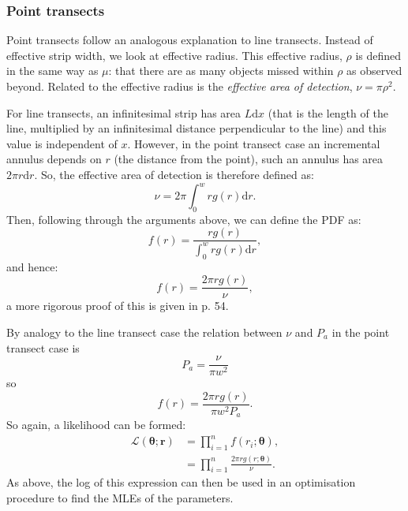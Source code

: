 \subsubsection{Point transects} 

Point transects follow an analogous explanation to line transects. Instead of effective strip width, we look at effective radius. This effective radius, $\rho$ is defined in the same way as $\mu$: that there are as many objects missed within $\rho$ as observed beyond. Related to the effective radius is the \textit{effective area of detection}, $\nu=\pi \rho^2$.

For line transects, an infinitesimal strip has area $L\text{d}x$ (that is the length of the line, multiplied by an infinitesimal distance perpendicular to the line) and this value is independent of $x$. However, in the point transect case an incremental annulus depends on $r$ (the distance from the point), such an annulus has area $2\pi r \text{d}r$. So, the effective area of detection is therefore defined as:
\begin{equation}
\nu = 2 \pi \int_0^w r g(r) \text{d}r.
\end{equation}
Then, following through the arguments above, we can define the PDF as:
\begin{equation}
f(r) = \frac{r g(r)}{\int_0^w r g(r) \text{d}r},
\end{equation}
and hence: 
\begin{equation}
f(r) = \frac{2 \pi r g(r)}{\nu},
\end{equation}
a more rigorous proof of this is given in  p. 54.

By analogy to the line transect case the relation between $\nu$ and $P_a$ in the point transect case is
\begin{equation}
P_a=\frac{\nu}{\pi w^2}
\end{equation}
so
\begin{equation}
f(r) = \frac{2 \pi r g(r)}{\pi w^2 P_a}.
\end{equation}
So again, a likelihood can be formed:
\begin{align}
\mathcal{L}(\bm{\theta}; \bm{r}) &= \prod_{i=1}^n f(r_i;\bm{\theta}),\\
&= \prod_{i=1}^n \frac{2 \pi r g(r;\bm{\theta})}{\nu}.
\end{align}
As above, the log of this expression can then be used in an optimisation procedure to find the MLEs of the parameters.


